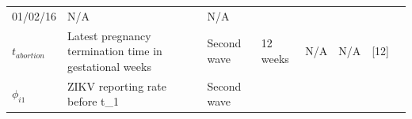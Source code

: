 \documentclass[10pt,letterpaper]{article}
\begin{document}
\begin{longtable}[]{@{}llllllll@{}}
\begin{minipage}[t]{0.05\columnwidth}
01/02/16\strut
\end{minipage} & \begin{minipage}[t]{0.04\columnwidth}\raggedright\strut
N/A\strut
\end{minipage} & \begin{minipage}[t]{0.04\columnwidth}\raggedright\strut
N/A\strut
\end{minipage} & \begin{minipage}[t]{0.14\columnwidth}\raggedright\strut
\strut
\end{minipage} & \begin{minipage}[t]{0.26\columnwidth}\raggedright\strut
\strut
\end{minipage}\tabularnewline
\begin{minipage}[t]{0.04\columnwidth}\raggedright\strut
\(t_{abortion}\)\strut
\end{minipage} & \begin{minipage}[t]{0.17\columnwidth}\raggedright\strut
Latest pregnancy termination time in gestational weeks\strut
\end{minipage} & \begin{minipage}[t]{0.05\columnwidth}\raggedright\strut
Second wave\strut
\end{minipage} & \begin{minipage}[t]{0.05\columnwidth}\raggedright\strut
12 weeks\strut
\end{minipage} & \begin{minipage}[t]{0.04\columnwidth}\raggedright\strut
N/A\strut
\end{minipage} & \begin{minipage}[t]{0.04\columnwidth}\raggedright\strut
N/A\strut
\end{minipage} & \begin{minipage}[t]{0.14\columnwidth}\raggedright\strut
{[}12{]}\strut
\end{minipage} & \begin{minipage}[t]{0.26\columnwidth}\raggedright\strut
\strut
\end{minipage}\tabularnewline
\begin{minipage}[t]{0.04\columnwidth}\raggedright\strut
\(\phi_{i1}\)\strut
\end{minipage} & \begin{minipage}[t]{0.17\columnwidth}\raggedright\strut
ZIKV reporting rate before t\_1\strut
\end{minipage} & \begin{minipage}[t]{0.05\columnwidth}\raggedright\strut
Second wave\strut

\end{minipage}
\end{longtable}
\end{document}
